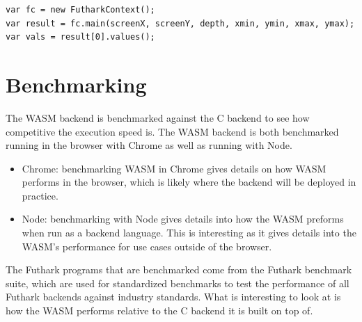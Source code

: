 \documentclass[11pt]{book}
\begin{document}
\begin{verbatim}
var fc = new FutharkContext();
var result = fc.main(screenX, screenY, depth, xmin, ymin, xmax, ymax);
var vals = result[0].values();
\end{verbatim}

\section{Benchmarking}

The WASM backend is benchmarked against the C backend to see how competitive the execution speed is. The WASM backend is both benchmarked running in the browser with Chrome as well as running with Node. 
\begin{itemize}
    \item Chrome: benchmarking WASM in Chrome gives details on how WASM performs in the browser, which is likely where the backend will be deployed in practice.
    \item Node: benchmarking with Node gives details into how the WASM preforms when run as a backend language. This is interesting as it gives details into the WASM's performance for use cases outside of the browser.
\end{itemize}



The Futhark programs that are benchmarked come from the Futhark benchmark suite, which are used for standardized benchmarks to test the performance of all Futhark backends against industry standards. What is interesting to look at is how the WASM performs relative to the C backend it is built on top of.
\begin{table}[h!]
    \noindent{}
    \caption{Caption}
    \label{tab:my_label}
\end{table}
\end{document}

